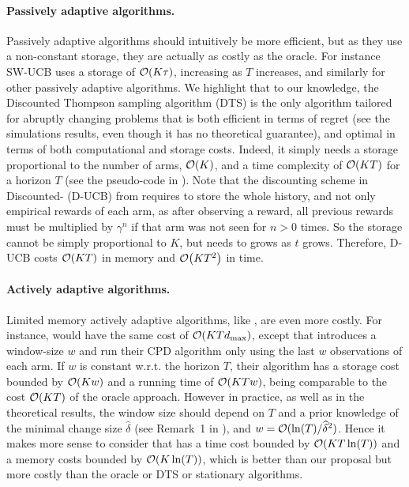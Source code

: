 \paragraph{Passively adaptive algorithms.}
%
Passively adaptive algorithms should intuitively be more efficient, but as they use a non-constant storage, they are actually as costly as the oracle.
For instance SW-UCB uses a storage of $\mathop{}\mathopen{}\mathcal{O}\mathopen{}\left(K \tau\right)$, increasing as $T$ increases, and similarly for other passively adaptive algorithms.
We highlight that to our knowledge, the Discounted Thompson sampling algorithm (DTS) is the only algorithm tailored for abruptly changing problems that is both efficient in terms of regret (see the simulations results, even though it has no theoretical guarantee), and optimal in terms of both computational and storage costs. Indeed, it simply needs a storage proportional to the number of arms, $\mathop{}\mathopen{}\mathcal{O}\mathopen{}\left(K\right)$, and a time complexity of $\mathop{}\mathopen{}\mathcal{O}\mathopen{}\left(KT\right)$ for a horizon $T$ (see the pseudo-code in \cite{RajKalyani17}).
Note that the discounting scheme in Discounted-\UCB{} (D-UCB) from \cite{Kocsis06} requires to store the whole history, and not only empirical rewards of each arm, as after observing a reward, all previous rewards must be multiplied by $\gamma^n$ if that arm was not seen for $n>0$ times. So the storage cannot be simply proportional to $K$, but needs to grows as $t$ grows.
Therefore, D-UCB costs $\mathop{}\mathopen{}\mathcal{O}\mathopen{}\left(K T\right)$ in memory and $\mathop{}\mathopen{}\mathcal{O}\mathopen{}\left(K T^2\right)$ in time.


\paragraph{Actively adaptive algorithms.}
%
Limited memory actively adaptive algorithms, like \MUCB, are even more costly.
For instance, \MUCB{} would have the same cost of $\mathop{}\mathopen{}\mathcal{O}\mathopen{}\left(K T d_{\max}\right)$, except that \cite{CaoZhenKvetonXie18} introduces a window-size $w$ and run their CPD algorithm only using the last $w$ observations of each arm. If $w$ is constant w.r.t. the horizon $T$, their algorithm has a storage cost bounded by $\mathop{}\mathopen{}\mathcal{O}\mathopen{}\left(K w\right)$ and a running time of $\mathop{}\mathopen{}\mathcal{O}\mathopen{}\left(K T w\right)$, being comparable to the cost $\mathop{}\mathopen{}\mathcal{O}\mathopen{}\left(K T\right)$ of the oracle approach.
However in practice, as well as in the theoretical results, the window size should depend on $T$ and a prior knowledge of the minimal change size $\widehat{\delta}$ (see Remark~1 in \cite{CaoZhenKvetonXie18}), and $w = \mathcal{O}(\ln(T) / \widehat{\delta}^2)$.
Hence it makes more sense to consider that \MUCB{} has a time cost bounded by $\mathop{}\mathopen{}\mathcal{O}\mathopen{}\left(K T \ln(T)\right)$ and a memory costs bounded by $\mathop{}\mathopen{}\mathcal{O}\mathopen{}\left(K \ln(T)\right)$, which is better than our proposal but more costly than the oracle or DTS or stationary algorithms.


